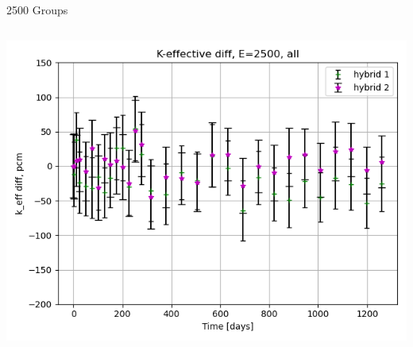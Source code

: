 \documentclass[
	11pt, %
	aspectratio=169, %
]{beamer}
\begin{document}
\begin{frame}{2500 Groups}
\begin{columns}[c]
\begin{column}{0.32\textwidth}
			\includegraphics[width=\textwidth]{../figures/keff/keff_all_2500_diff.png}
		\end{column}
	\end{columns}
\end{frame}
\end{document}
